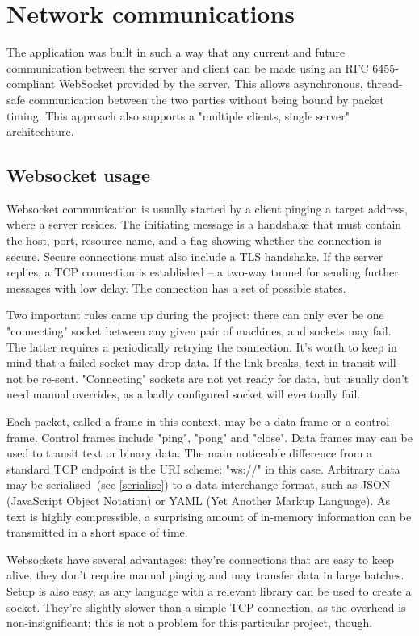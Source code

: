 \chapter{Network communications}
The application was built in such a way that any current and future communication between the server and client can be made using an RFC 6455-compliant\cite{RFC6455} WebSocket provided by the server. This allows asynchronous, thread-safe communication between the two parties without being bound by packet timing. This approach also supports a "multiple clients, single server" architechture.

\section{Websocket usage}
Websocket communication is usually started by a client pinging a target address, where a server resides. The initiating message is a handshake that must contain the host, port, resource name, and a flag showing whether the connection is secure. Secure connections must also include a TLS handshake. If the server replies, a TCP connection is established -- a two-way tunnel for sending further messages with low delay. The connection has a set of possible states.

Two important rules came up during the project: there can only ever be one "connecting" socket between any given pair of machines, and sockets may fail. The latter requires a periodically retrying the connection. It's worth to keep in mind that a failed socket may drop data. If the link breaks, text in transit will not be re-sent. "Connecting" sockets are not yet ready for data, but usually don't need manual overrides, as a badly configured socket will eventually fail.

Each packet, called a frame in this context, may be a data frame or a control frame. Control frames include "ping", "pong" and "close". Data frames may can be used to transit text or binary data. The main noticeable difference from a standard TCP endpoint is the URI scheme: "ws://" in this case. Arbitrary data may be serialised~(see \ref{serialise}) to a data interchange format, such as JSON (JavaScript Object Notation) or YAML (Yet Another Markup Language). As text is highly compressible, a surprising amount of in-memory information can be transmitted in a short space of time.

Websockets have several advantages: they're connections that are easy to keep alive, they don't require manual pinging and may transfer data in large batches. Setup is also easy, as any language with a relevant library can be used to create a socket. They're slightly slower than a simple TCP connection, as the overhead is non-insignificant; this is not a problem for this particular project, though.

